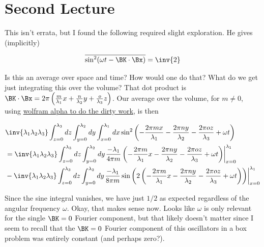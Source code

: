 \section{Second Lecture}

This isn't errata, but I found the following required slight exploration.  He gives (implicitly)

\begin{align*}
\overline{\sin^2(\omega t - \BK \cdot \Bx)} = \inv{2}
\end{align*}

Is this an average over space and time?  How would one do that?  What do we get just integrating this over the volume?  That dot product is $\BK \cdot \Bx = 2 \pi \left(\frac{m}{\lambda_1} x + \frac{n}{\lambda_2} y + \frac{o}{\lambda_3} z \right)$.  Our average over the volume, for $m \ne 0$, using \href{http://www.wolframalpha.com/input/?i=\int+sin^2(a+x+%2B+b)+dx}{wolfram alpha to do the dirty work}, is then

\begin{align*}
&\inv{\lambda_1 \lambda_2 \lambda_3} 
\int_{z=0}^{\lambda_3} dz
\int_{y=0}^{\lambda_2} dy
\int_{x=0}^{\lambda_1}
dx \sin^2 \left( 
-\frac{2 \pi m x}{\lambda_1} 
-\frac{2 \pi n y}{\lambda_2} 
-\frac{2 \pi o z}{\lambda_3} 
+ \omega t \right) \\
&=
\inv{\lambda_1 \lambda_2 \lambda_3} 
\int_{z=0}^{\lambda_3} dz
\int_{y=0}^{\lambda_2} dy
{\left.
\frac{-\lambda_1}{4 \pi m} \left( 
-\frac{2 \pi m }{\lambda_1} x 
-\frac{2 \pi n y}{\lambda_2} 
-\frac{2 \pi o z}{\lambda_3} 
+ \omega t \right)
\right\vert}_{x=0}^{\lambda_1} \\
&-
\inv{\lambda_1 \lambda_2 \lambda_3} 
\int_{z=0}^{\lambda_3} dz
\int_{y=0}^{\lambda_2} dy
{\left.
\frac{-\lambda_1}{8 \pi m} 
\sin \left( 2 \left(
-\frac{2 \pi m }{\lambda_1} x 
-\frac{2 \pi n y}{\lambda_2} 
-\frac{2 \pi o z}{\lambda_3} 
+ \omega t \right) \right)
\right\vert}_{x=0}^{\lambda_1}
\end{align*}

Since the sine integral vanishes, we have just $1/2$ as expected regardless of the angular frequency $\omega$.  Okay, that makes sense now.  Looks like $\omega$ is only relevant for the single $\BK = 0$ Fourier component, but that likely doesn't matter since I seem to recall that the $\BK = 0$ Fourier component of this oscillators in a box problem was entirely constant (and perhaps zero?).

\EndNoBibArticle
